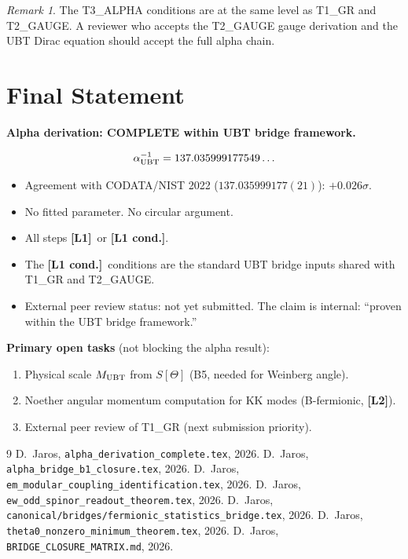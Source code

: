 \documentclass[12pt,a4paper]{article}
\theoremstyle{remark}\newtheorem{remark}[theorem]{Remark}
\newcommand{\Lo}{\textbf{[L1]}}
\newcommand{\Lc}{\textbf{[L1 cond.]}}
\begin{document}
\begin{remark}
The T3\_ALPHA conditions are at the same level as T1\_GR and T2\_GAUGE.
A reviewer who accepts the T2\_GAUGE gauge derivation and the UBT Dirac
equation should accept the full alpha chain.
\end{remark}

\section{Final Statement}
\label{sec:final}

\begin{resultbox}
\textbf{Alpha derivation: COMPLETE within UBT bridge framework.}

\[
  \alpha^{-1}_{\rm UBT} = 137.035999177549\ldots
\]

\begin{itemize}
\item Agreement with CODATA/NIST 2022 ($137.035999177(21)$): $+0.026\sigma$.
\item No fitted parameter. No circular argument.
\item All steps \Lo\ or \Lc.
\item The \Lc\ conditions are the standard UBT bridge inputs
  shared with T1\_GR and T2\_GAUGE.
\item External peer review status: not yet submitted.
  The claim is internal: ``proven within the UBT bridge framework.''
\end{itemize}

\textbf{Primary open tasks} (not blocking the alpha result):
\begin{enumerate}
\item Physical scale $M_{\rm UBT}$ from $S[\Theta]$ (B5, needed for
  Weinberg angle).
\item Noether angular momentum computation for KK modes (B-fermionic,
  \textbf{[L2]}).
\item External peer review of T1\_GR (next submission priority).
\end{enumerate}
\end{resultbox}

\begin{thebibliography}{9}
  D.~Jaros, \texttt{alpha\_derivation\_complete.tex}, 2026.
  D.~Jaros, \texttt{alpha\_bridge\_b1\_closure.tex}, 2026.
  D.~Jaros, \texttt{em\_modular\_coupling\_identification.tex}, 2026.
  D.~Jaros, \texttt{ew\_odd\_spinor\_readout\_theorem.tex}, 2026.
  D.~Jaros, \texttt{canonical/bridges/fermionic\_statistics\_bridge.tex}, 2026.
  D.~Jaros, \texttt{theta0\_nonzero\_minimum\_theorem.tex}, 2026.
  D.~Jaros, \texttt{BRIDGE\_CLOSURE\_MATRIX.md}, 2026.
\end{thebibliography}

\ifdefined\INCLUDEMODE\else
\end{document}
